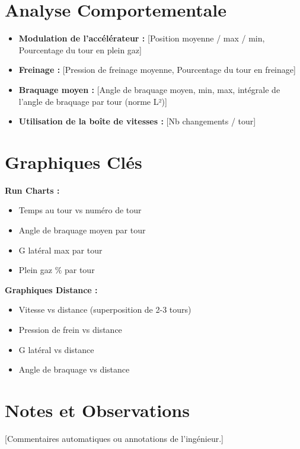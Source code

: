 \documentclass[11pt,a4paper]{article}
\begin{document}
\section{Analyse Comportementale}
\begin{itemize}
    \item \textbf{Modulation de l’accélérateur :} [Position moyenne / max / min, Pourcentage du tour en plein gaz] 
    \item \textbf{Freinage :} [Pression de freinage moyenne, Pourcentage du tour en freinage]
    \item \textbf{Braquage moyen :} [Angle de braquage moyen, min, max, intégrale de l'angle de braquage par tour (norme L²)]
    \item \textbf{Utilisation de la boîte de vitesses :} [Nb changements / tour]
\end{itemize}

\section{Graphiques Clés}
\vspace{0.5cm}
\textbf{Run Charts :}
\begin{itemize}
    \item Temps au tour vs numéro de tour
    \item Angle de braquage moyen par tour
    \item G latéral max par tour
    \item Plein gaz \(\%\) par tour
\end{itemize}

\vspace{0.5cm}
\textbf{Graphiques Distance :}
\begin{itemize}
    \item Vitesse vs distance (superposition de 2-3 tours)
    \item Pression de frein vs distance
    \item G latéral vs distance
    \item Angle de braquage vs distance
\end{itemize}

\section{Notes et Observations}
\vspace{0.2cm}
[Commentaires automatiques ou annotations de l’ingénieur.]
\end{document}
